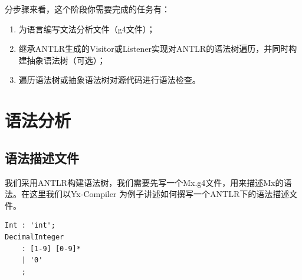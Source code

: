 分步骤来看，这个阶段你需要完成的任务有：
\begin{enumerate}
    \item 为语言编写文法分析文件（g4文件）；
    \item 继承ANTLR生成的Visitor或Listener实现对ANTLR的语法树遍历，并同时构建抽象语法树（可选）；
    \item 遍历语法树或抽象语法树对源代码进行语法检查。
\end{enumerate}





\section{语法分析}
\subsection{语法描述文件}
我们采用ANTLR构建语法树，我们需要先写一个Mx.g4文件，用来描述Mx的语法。在这里我们以Yx-Compiler%
为例子讲述如何撰写一个ANTLR下的语法描述文件。
\begin{lstlisting}
Int : 'int';
DecimalInteger
    : [1-9] [0-9]*
    | '0'
    ;
\end{lstlisting}

